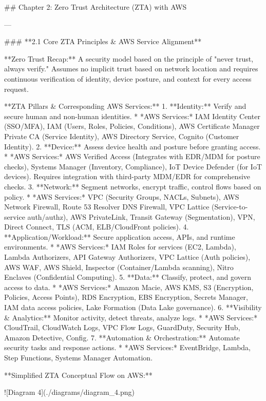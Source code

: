 \documentclass{article}
\begin{document}
## Chapter 2: Zero Trust Architecture (ZTA) with AWS

---

### **2.1 Core ZTA Principles & AWS Service Alignment**

**Zero Trust Recap:** A security model based on the principle of "never trust, always verify." Assumes no implicit trust based on network location and requires continuous verification of identity, device posture, and context for every access request.

**ZTA Pillars & Corresponding AWS Services:**
1.  **Identity:** Verify and secure human and non-human identities.
    * *AWS Services:* IAM Identity Center (SSO/MFA), IAM (Users, Roles, Policies, Conditions), AWS Certificate Manager Private CA (Service Identity), AWS Directory Service, Cognito (Customer Identity).
2.  **Device:** Assess device health and posture before granting access.
    * *AWS Services:* AWS Verified Access (Integrates with EDR/MDM for posture checks), Systems Manager (Inventory, Compliance), IoT Device Defender (for IoT devices). Requires integration with third-party MDM/EDR for comprehensive checks.
3.  **Network:** Segment networks, encrypt traffic, control flows based on policy.
    * *AWS Services:* VPC (Security Groups, NACLs, Subnets), AWS Network Firewall, Route 53 Resolver DNS Firewall, VPC Lattice (Service-to-service auth/authz), AWS PrivateLink, Transit Gateway (Segmentation), VPN, Direct Connect, TLS (ACM, ELB/CloudFront policies).
4.  **Application/Workload:** Secure application access, APIs, and runtime environments.
    * *AWS Services:* IAM Roles for services (EC2, Lambda), Lambda Authorizers, API Gateway Authorizers, VPC Lattice (Auth policies), AWS WAF, AWS Shield, Inspector (Container/Lambda scanning), Nitro Enclaves (Confidential Computing).
5.  **Data:** Classify, protect, and govern access to data.
    * *AWS Services:* Amazon Macie, AWS KMS, S3 (Encryption, Policies, Access Points), RDS Encryption, EBS Encryption, Secrets Manager, IAM data access policies, Lake Formation (Data Lake governance).
6.  **Visibility & Analytics:** Monitor activity, detect threats, analyze logs.
    * *AWS Services:* CloudTrail, CloudWatch Logs, VPC Flow Logs, GuardDuty, Security Hub, Amazon Detective, Config.
7.  **Automation & Orchestration:** Automate security tasks and response actions.
    * *AWS Services:* EventBridge, Lambda, Step Functions, Systems Manager Automation.

**Simplified ZTA Conceptual Flow on AWS:**


![Diagram 4](./diagrams/diagram_4.png)
\end{document}
